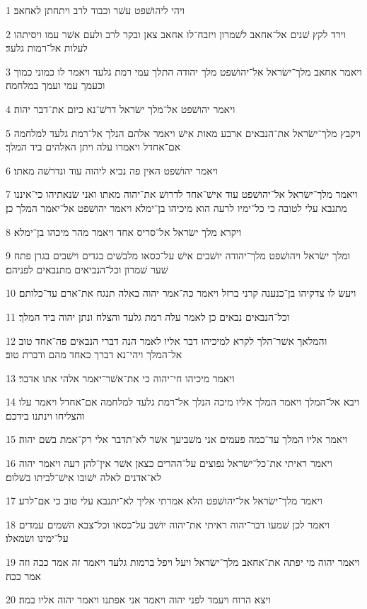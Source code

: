 \par 1 ויהי ליהושׁפט עשׁר וכבוד לרב ויתחתן לאחאב׃
\par 2 וירד לקץ שׁנים אל־אחאב לשׁמרון ויזבח־לו אחאב צאן ובקר לרב ולעם אשׁר עמו ויסיתהו לעלות אל־רמות גלעד׃
\par 3 ויאמר אחאב מלך־ישׂראל אל־יהושׁפט מלך יהודה התלך עמי רמת גלעד ויאמר לו כמוני כמוך וכעמך עמי ועמך במלחמה׃
\par 4 ויאמר יהושׁפט אל־מלך ישׂראל דרשׁ־נא כיום את־דבר יהוה׃
\par 5 ויקבץ מלך־ישׂראל את־הנבאים ארבע מאות אישׁ ויאמר אלהם הנלך אל־רמת גלעד למלחמה אם־אחדל ויאמרו עלה ויתן האלהים ביד המלך׃
\par 6 ויאמר יהושׁפט האין פה נביא ליהוה עוד ונדרשׁה מאתו׃
\par 7 ויאמר מלך־ישׂראל אל־יהושׁפט עוד אישׁ־אחד לדרושׁ את־יהוה מאתו ואני שׂנאתיהו כי־איננו מתנבא עלי לטובה כי כל־ימיו לרעה הוא מיכיהו בן־ימלא ויאמר יהושׁפט אל־יאמר המלך כן׃
\par 8 ויקרא מלך ישׂראל אל־סריס אחד ויאמר מהר מיכהו בן־ימלא׃
\par 9 ומלך ישׂראל ויהושׁפט מלך־יהודה יושׁבים אישׁ על־כסאו מלבשׁים בגדים וישׁבים בגרן פתח שׁער שׁמרון וכל־הנביאים מתנבאים לפניהם׃
\par 10 ויעשׂ לו צדקיהו בן־כנענה קרני ברזל ויאמר כה־אמר יהוה באלה תנגח את־ארם עד־כלותם׃
\par 11 וכל־הנבאים נבאים כן לאמר עלה רמת גלעד והצלח ונתן יהוה ביד המלך׃
\par 12 והמלאך אשׁר־הלך לקרא למיכיהו דבר אליו לאמר הנה דברי הנבאים פה־אחד טוב אל־המלך ויהי־נא דברך כאחד מהם ודברת טוב׃
\par 13 ויאמר מיכיהו חי־יהוה כי את־אשׁר־יאמר אלהי אתו אדבר׃
\par 14 ויבא אל־המלך ויאמר המלך אליו מיכה הנלך אל־רמת גלעד למלחמה אם־אחדל ויאמר עלו והצליחו וינתנו בידכם׃
\par 15 ויאמר אליו המלך עד־כמה פעמים אני משׁביעך אשׁר לא־תדבר אלי רק־אמת בשׁם יהוה׃
\par 16 ויאמר ראיתי את־כל־ישׂראל נפוצים על־ההרים כצאן אשׁר אין־להן רעה ויאמר יהוה לא־אדנים לאלה ישׁובו אישׁ־לביתו בשׁלום׃
\par 17 ויאמר מלך־ישׂראל אל־יהושׁפט הלא אמרתי אליך לא־יתנבא עלי טוב כי אם־לרע׃
\par 18 ויאמר לכן שׁמעו דבר־יהוה ראיתי את־יהוה יושׁב על־כסאו וכל־צבא השׁמים עמדים על־ימינו ושׂמאלו׃
\par 19 ויאמר יהוה מי יפתה את־אחאב מלך־ישׂראל ויעל ויפל ברמות גלעד ויאמר זה אמר ככה וזה אמר ככה׃
\par 20 ויצא הרוח ויעמד לפני יהוה ויאמר אני אפתנו ויאמר יהוה אליו במה׃
